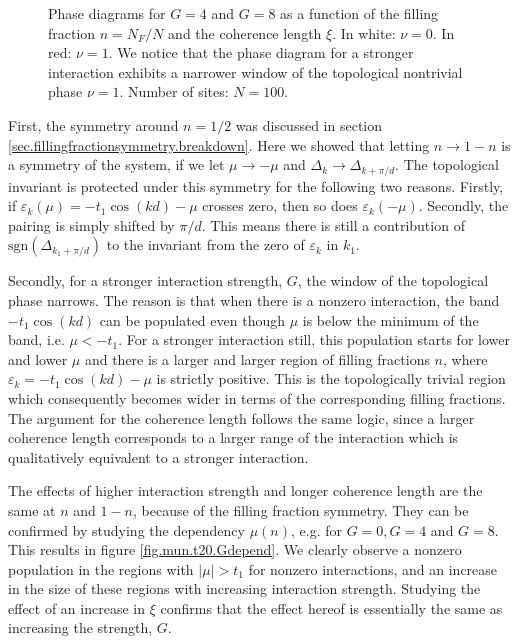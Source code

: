 \begin{figure}
\begin{center}

\caption{Phase diagrams for $G = 4$ and $G = 8$ as a function of the filling fraction $n = N_F / N$ and the coherence length $\xi$. In white: $\nu = 0$. In red: $\nu = 1$. We notice that the phase diagram for a stronger interaction exhibits a narrower window of the topological nontrivial phase $\nu = 1$. Number of sites: $N = 100$. }
\label{fig.phasediagram.t20}
\end{center}
\end{figure}

First, the symmetry around $n = 1/2$ was discussed in section \ref{sec.fillingfractionsymmetry.breakdown}. Here we showed that letting $n \to 1 - n$ is a symmetry of the system, if we let $\mu \to -\mu$ and $\Delta_{k} \to \Delta_{k + \pi/d}$. The topological invariant is protected under this symmetry for the following two reasons. Firstly, if $\varepsilon_k(\mu) = -t_1\cos(kd) - \mu$ crosses zero, then so does $\varepsilon_k(-\mu)$. Secondly, the pairing is simply shifted by $\pi / d$. This means there is still a contribution of $\text{sgn}(\Delta_{k_1+\pi/d})$ to the invariant from the zero of $\varepsilon_k$ in $k_1$.

Secondly, for a stronger interaction strength, $G$, the window of the topological phase narrows. The reason is that when there is a nonzero interaction, the band $-t_1\cos(kd)$ can be populated even though $\mu$ is below the minimum of the band, i.e. $\mu < -t_1$. For a stronger interaction still, this population starts for lower and lower $\mu$ and there is a larger and larger region of filling fractions $n$, where $\varepsilon_k = -t_1\cos(kd) - \mu$ is strictly positive. This is the topologically trivial region which consequently becomes wider in terms of the corresponding filling fractions. The argument for the coherence length follows the same logic, since a larger coherence length corresponds to a larger range of the interaction which is qualitatively equivalent to a stronger interaction. 

The effects of higher interaction strength and longer coherence length are the same at $n$ and $1 - n$, because of the filling fraction symmetry. They can be confirmed by studying the dependency $\mu(n)$, e.g. for $G = 0, G = 4$ and $G = 8$. This results in figure \ref{fig.mun.t20.Gdepend}. We clearly observe a nonzero population in the regions with $|\mu| > t_1$ for nonzero interactions, and an increase in the size of these regions with increasing interaction strength. Studying the effect of an increase in $\xi$ confirms that the effect hereof is essentially the same as increasing the strength, $G$.  

